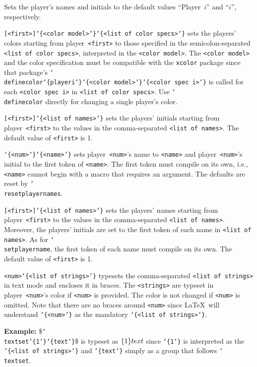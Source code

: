 \documentclass{article}
\newenvironment{desc}{\itemize[leftmargin=50pt]}{\enditemize}
\def\macro#1{\item[\cmd{#1}]}
\def\macroarg#1#2{\item[\cmd{#1}] \hskip-2.5pt\texttt{#2}}
\renewcommand{\textbackslash}{\char`\\}
\def\cmd#1{\texttt{\color{cmd}\textbackslash#1}}
\def\leftbrace{\char`\{}
\def\rightbrace{\char`\}}
\def\arg#1{{\color{cmd}\leftbrace}{\color{black}#1}{\color{cmd}\rightbrace}}
\def\optarg[#1]{{\color{player1}[#1]}}
\begin{document}
\begin{desc}
\macro{resetplayernames} Sets the player's names and initials to the default values ``Player~$i$'' and ``$i$'', respectively.

\macroarg{setplayercolors}{\optarg[<first>]\arg{<color model>}\arg{<list of color specs>}} sets the players' colors starting from player~\texttt{<first>} to those specified in the semicolon-separated \texttt{<list of color specs>}, interpreted in the \texttt{<color model>}. The \texttt{<color model>} and the color specification must be compatible with the \texttt{xcolor} package since that package's \cmd{definecolor\arg{playeri}\arg{<color model>}\arg{<color spec i>}} is called for each \texttt{<color spec i>} in \texttt{<list of color specs>}. Use \cmd{definecolor} directly for changing a single player's color.

\macroarg{setplayerinitials}{\optarg[<first>]\arg{<list of names>}} sets the players' initials starting from player~\texttt{<first>} to the values in the comma-separated \texttt{<list of names>}. The default value of \texttt{<first>} is 1.

\macroarg{setplayername}{\arg{<num>}\arg{<name>}} sets player~\texttt{<num>}'s name to \texttt{<name>} and player~\texttt{<num>}'s initial to the first token of \texttt{<name>}. The first token must compile on its own, i.e., \texttt{<name>} cannot begin with a macro that requires an argument. The defaults are reset by \cmd{resetplayernames}.

\macroarg{setplayernames}{\optarg[<first>]\arg{<list of names>}} sets the players' names starting from player~\texttt{<first>} to the values in the comma-separated \texttt{<list of names>}. Moreover, the players' initials are set to the first token of each name in \texttt{<list of names>}. As for \cmd{setplayername}, the first token of each name must compile on its own. The default value of \texttt{<first>} is 1.

\macroarg{textset}{<num>\arg{<list of strings>}} typesets the comma-separated \texttt{<list of strings>} in text mode and encloses it in braces. The \texttt{<strings>} are typeset in player~\texttt{<num>}'s color if \texttt{<num>} is provided. The color is not changed if \texttt{<num>} is omitted. Note that there are no braces around \texttt{<num>} since \LaTeX\ will understand \texttt{\arg{<num>}} as the mandatory \texttt{\arg{<list of strings>}}.

{\color{player3}\textbf{Example:} \$\cmd{textset\arg{1}\arg{text}}\$ is typeset as $\textset{1}{text}$ since \texttt{\arg{1}} is interpreted as the \texttt{\arg{<list of strings>}} and \texttt{\arg{text}} simply as a group that follows \cmd{textset}.}
\end{desc}
\end{document}

